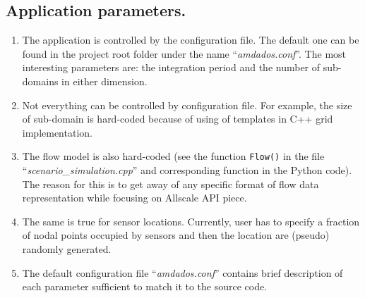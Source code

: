 \documentclass[]{article}
\begin{document}
\subsection{Application parameters.}
\begin{enumerate}
\item The application is controlled by the configuration file. The default one can be found in the project root folder under the name ``\textit{amdados.conf}''. The most interesting parameters are: the integration period and the number of sub-domains in either dimension. 
\item Not everything can be controlled by configuration file. For example, the size of sub-domain is hard-coded because of using of templates in C++ grid implementation.
\item The flow model is also hard-coded (see the function \texttt{Flow()} in the file ``\textit{scenario\_simulation.cpp}'' and corresponding function in the Python code). The reason for this is to get away of any specific format of flow data representation while focusing on Allscale API piece.
\item The same is true for sensor locations. Currently, user has to specify a fraction of nodal points occupied by sensors and then the location are (pseudo) randomly generated.
\item The default configuration file ``\textit{amdados.conf}'' contains brief description of each parameter sufficient to match it to the source code.
\end{enumerate}
\end{document}
